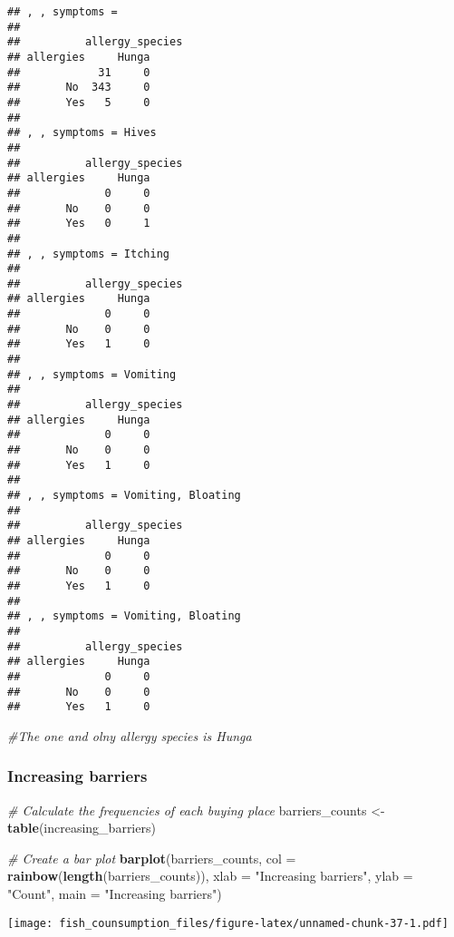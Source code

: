 \documentclass[
]{article}
\newenvironment{Shaded}{\begin{snugshade}}{\end{snugshade}}
\newcommand{\AttributeTok}[1]{\textcolor[rgb]{0.13,0.29,0.53}{#1}}
\newcommand{\CommentTok}[1]{\textcolor[rgb]{0.56,0.35,0.01}{\textit{#1}}}
\newcommand{\FunctionTok}[1]{\textcolor[rgb]{0.13,0.29,0.53}{\textbf{#1}}}
\newcommand{\NormalTok}[1]{#1}
\newcommand{\OtherTok}[1]{\textcolor[rgb]{0.56,0.35,0.01}{#1}}
\newcommand{\StringTok}[1]{\textcolor[rgb]{0.31,0.60,0.02}{#1}}
\begin{document}
\begin{verbatim}
## , , symptoms = 
## 
##          allergy_species
## allergies     Hunga
##            31     0
##       No  343     0
##       Yes   5     0
## 
## , , symptoms = Hives
## 
##          allergy_species
## allergies     Hunga
##             0     0
##       No    0     0
##       Yes   0     1
## 
## , , symptoms = Itching
## 
##          allergy_species
## allergies     Hunga
##             0     0
##       No    0     0
##       Yes   1     0
## 
## , , symptoms = Vomiting
## 
##          allergy_species
## allergies     Hunga
##             0     0
##       No    0     0
##       Yes   1     0
## 
## , , symptoms = Vomiting, Bloating
## 
##          allergy_species
## allergies     Hunga
##             0     0
##       No    0     0
##       Yes   1     0
## 
## , , symptoms = Vomiting, Bloating 
## 
##          allergy_species
## allergies     Hunga
##             0     0
##       No    0     0
##       Yes   1     0
\end{verbatim}

\begin{Shaded}
\begin{Highlighting}[]
\CommentTok{\#The one and olny allergy species is Hunga}
\end{Highlighting}
\end{Shaded}

\hypertarget{increasing-barriers}{%
\subsubsection{Increasing barriers}\label{increasing-barriers}}

\begin{Shaded}
\begin{Highlighting}[]
\CommentTok{\# Calculate the frequencies of each buying place}
\NormalTok{barriers\_counts }\OtherTok{\textless{}{-}} \FunctionTok{table}\NormalTok{(increasing\_barriers)}

\CommentTok{\# Create a bar plot}
\FunctionTok{barplot}\NormalTok{(barriers\_counts, }\AttributeTok{col =} \FunctionTok{rainbow}\NormalTok{(}\FunctionTok{length}\NormalTok{(barriers\_counts)), }
        \AttributeTok{xlab =} \StringTok{"Increasing barriers"}\NormalTok{, }\AttributeTok{ylab =} \StringTok{"Count"}\NormalTok{, }\AttributeTok{main =} \StringTok{"Increasing barriers"}\NormalTok{)}
\end{Highlighting}
\end{Shaded}

\texttt{[image: fish\_counsumption\_files/figure-latex/unnamed-chunk-37-1.pdf]}
\end{document}
